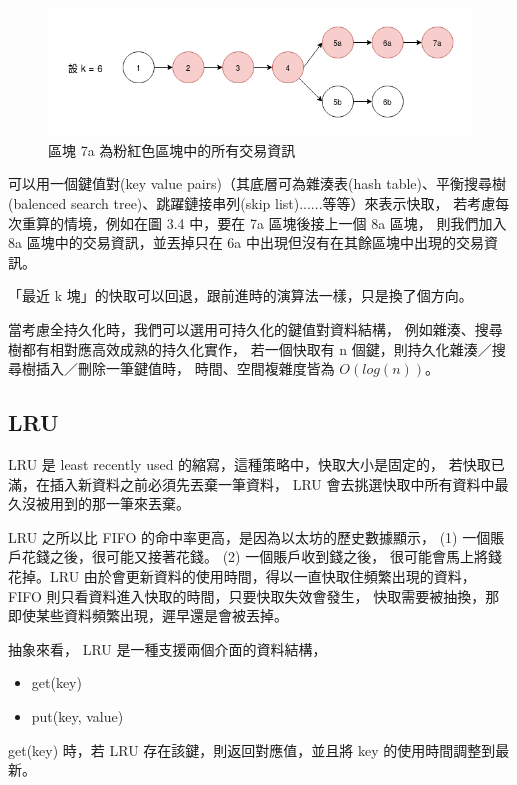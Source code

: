 \begin{figure}[h]
\includegraphics[width=\textwidth]{最近k塊}
\caption{區塊 7a 為粉紅色區塊中的所有交易資訊}
\end{figure}

可以用一個鍵值對(key value pairs)（其底層可為雜湊表(hash table)、平衡搜尋樹(balenced search tree)、跳躍鏈接串列(skip list)......等等）來表示快取，
若考慮每次重算的情境，例如在圖 3.4 中，要在 7a 區塊後接上一個 8a 區塊，
則我們加入 8a 區塊中的交易資訊，並丟掉只在 6a 中出現但沒有在其餘區塊中出現的交易資訊。

「最近 k 塊」的快取可以回退，跟前進時的演算法一樣，只是換了個方向。

當考慮全持久化時，我們可以選用可持久化的鍵值對資料結構，
例如雜湊\cite{bagwell2001ideal}\cite{puente2017persistence}、搜尋樹都有相對應高效成熟的持久化實作，
若一個快取有 n 個鍵，則持久化雜湊／搜尋樹插入／刪除一筆鍵值時，
時間、空間複雜度皆為 $O(log(n))$。

\subsection{LRU}

LRU 是 least recently used 的縮寫，這種策略中，快取大小是固定的，
若快取已滿，在插入新資料之前必須先丟棄一筆資料，
LRU 會去挑選快取中所有資料中最久沒被用到的那一筆來丟棄。

LRU 之所以比 FIFO 的命中率更高，是因為以太坊的歷史數據顯示，
(1) 一個賬戶花錢之後，很可能又接著花錢。 (2) 一個賬戶收到錢之後，
很可能會馬上將錢花掉。LRU 由於會更新資料的使用時間，得以一直快取住頻繁出現的資料，
FIFO 則只看資料進入快取的時間，只要快取失效會發生，
快取需要被抽換，那即使某些資料頻繁出現，遲早還是會被丟掉。

抽象來看， LRU 是一種支援兩個介面的資料結構，

\begin{itemize}
  \item get(key)
  \item put(key, value)
\end{itemize}

get(key) 時，若 LRU 存在該鍵，則返回對應值，並且將 key 的使用時間調整到最新。

